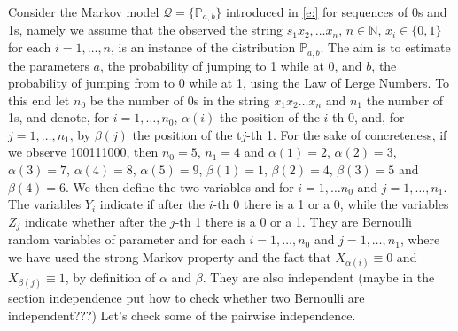 	\begin{example}
		Consider the Markov model $\mathcal Q =\{\mathbb P_{a,b}\}$ introduced in \eqref{e:} for sequences of 0s and 1s, namely we assume that the  observed the string $s_1x_2, \ldots x_n$, $n \in \mathbb N$, $x_i \in \{0,1\}$ for each $i = 1,\ldots,n$, is an instance of the distribution $\mathbb P_{a,b}$. The aim is to estimate the parameters $a$, the probability of jumping to 1 while at 0, and $b$, the probability of jumping from to 0 while at 1,  using the Law of Lerge Numbers. To this end let $n_0$ be the number of 0s in the string $x_1x_2\ldots x_n$ and $n_1$ the number of 1s, and denote, for $i = 1, \ldots,n_0$, $\alpha(i)$ the position of the $i$-th 0, and, for $j = 1, \ldots, n_1$, by $\beta(j)$ the position of the t$j$-th 1. For the sake of concreteness, if we observe 100111000, then $n_0 = 5$, $n_1 = 4$ and $\alpha(1) = 2$, $\alpha(2) = 3$, $\alpha(3) = 7$, $\alpha(4) = 8$, $\alpha(5) = 9$, $\beta(1) = 1$, $\beta(2) =4$, $\beta(3) = 5$ and $\beta(4) = 6$. We then define the two variables   
	and
	for $i = 1, \ldots n_0$ and $j = 1, \ldots, n_1$. The variables $Y_i$ indicate if after the $i$-th 0 there is a 1 or a 0, while the variables $Z_j$ indicate whether after the $j$-th 1 there is a 0 or a 1. They are Bernoulli random variables of parameter 
	and  
	for each $i = 1, \ldots, n_0$ and $j = 1, \ldots, n_1$, where we have used the strong Markov property and the fact that $X_{\alpha(i)} \equiv 0$ and $X_{\beta(j)}\equiv 1$, by definition of $\alpha$ and $\beta$. They are also independent (maybe in the section independence put how to check whether two Bernoulli are independent???) Let's check some of the pairwise independence.    

\end{example}
